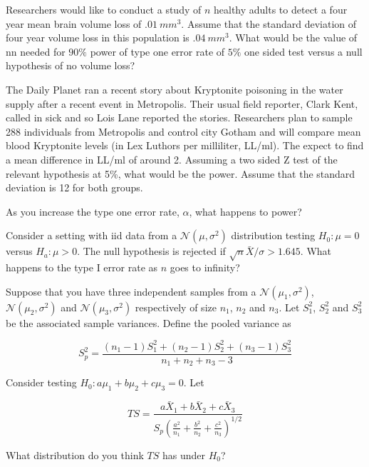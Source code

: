 \documentclass{homework}
\begin{document}
\begin{tcolorbox}[title=Question 8]
Researchers would like to conduct a study of $n$ healthy adults to detect a four year mean brain volume loss of  $.01~mm^3$. Assume that the standard deviation of four year volume loss in this population is $.04~mm^3$. What would be the value of nn needed for $90\%$ power of type one error rate of $5\%$ one sided test versus a null hypothesis of no volume loss?
\end{tcolorbox}

\begin{tcolorbox}[title=Question 9]
The Daily Planet ran a recent story about Kryptonite poisoning in the water supply after a recent event in Metropolis. Their usual field reporter, Clark Kent, called in sick and so Lois Lane reported the stories. Researchers plan to sample 288 individuals from Metropolis and control city Gotham and will compare mean blood Kryptonite levels (in Lex Luthors per milliliter, LL/ml). The expect to find a mean difference in LL/ml of around 2. Assuming a two sided Z test of the relevant hypothesis at 5\%, what would be the power. Assume that the standard deviation is 12 for both groups.
\end{tcolorbox}

\begin{tcolorbox}[title=Question 10]
As you increase the type one error rate, $\alpha$, what happens to power?
\end{tcolorbox}

\begin{tcolorbox}[title=Question 11]
Consider a setting with iid data from a $\mathcal{N}(\mu, \sigma^2)$ distribution testing $H_0: \mu = 0$ versus $H_a : \mu > 0$. The null hypothesis is rejected if  $\sqrt{n}\bar X / \sigma > 1.645$. What happens to the type I error rate as $n$ goes to infinity?
\end{tcolorbox}

\begin{tcolorbox}[title=Question 12]
Suppose that you have three independent samples from a $\mathcal{N}(\mu_1, \sigma^2)$, $\mathcal{N}(\mu_2, \sigma^2)$ and $\mathcal{N}(\mu_3, \sigma^2)$ respectively of size $n_1$, $n_2$ and $n_3$. Let $S_1^2$, $S_2^2$ and $S_3^2$ be the associated sample variances. Define the pooled variance as

$$
S_p^2 = \frac{(n_1 - 1) S_1^2 + (n_2 - 1) S_2^2 + (n_3 - 1) S_3^2}{n_1 + n_2 + n_3 - 3}
$$

Consider testing $H_0: a \mu_1 + b \mu_2 + c \mu_3 = 0$. Let

$$
TS = \frac{a \bar X_1 + b \bar X_2 + c \bar X_3}{S_p \left( \frac{a^2}{n_1} + \frac{b^2}{n_2} + \frac{c^2}{n_3} \right) ^ { 1/ 2}}
$$

What distribution do you think $TS$ has under $H_0$?
\end{tcolorbox}
\end{document}
